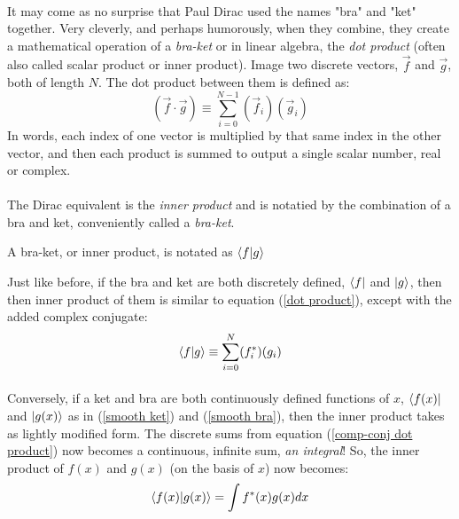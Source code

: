 \documentclass[12pt,letterpaper]{book}
\begin{document}
\paragraph*{}It may come as no surprise that Paul Dirac used the names "bra" and "ket" together. Very cleverly, and perhaps humorously, when they combine, they create a mathematical operation of a \textit{bra-ket} or in linear algebra, the \textit{dot product} (often also called scalar product or inner product). Image two discrete vectors, 
$\vec{f}$ and $\vec{g}$, both of length $N$. The dot product between them is defined as:
\begin{equation}
\label{dot product}
(\vec{f} \cdot \vec{g}) \equiv \sum_{i=0}^{N-1} (\vec{f}_i)(\vec{g}_i)
\end{equation}
In words, each index of one vector is multiplied by that same index in the other vector, and then each product is summed to output a single scalar number, real or complex.

\paragraph*{}The Dirac equivalent is the \textit{inner product} and is notatied by the combination of a bra and ket, conveniently called a \textit{bra-ket}.
\begin{center}
A bra-ket, or inner product, is notated as $\braket{f}{g}$
\end{center}
Just like before, if the bra and ket are both discretely defined, $\bra{f}$ and $\ket{g}$, then then inner product of them is similar to equation (\ref{dot product}), except with the added complex conjugate:
\begin{equation}
\label{comp-conj dot product}
\braket{f}{g} \equiv \sum_{i=0}^N (f^*_i) (g_i)
\end{equation}

\paragraph*{}Conversely, if a ket and bra are both continuously defined functions of $x$, $\bra{f(x)}$ and $\ket{g(x)}$ as in (\ref{smooth ket}) and (\ref{smooth bra}), then the inner product takes as lightly modified form. The discrete sums from equation (\ref{comp-conj dot product}) now becomes a continuous, infinite sum, \textit{an integral}! So, the inner product of $f(x)$ and $g(x)$ (on the basis of $x$) now becomes:
\begin{equation}
\label{bra-ket}
\braket{f(x)}{g(x)} = \int f^*(x) g(x) dx
\end{equation}
\end{document}
